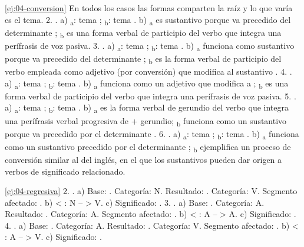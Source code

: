 \begin{solucion}{\ref{ej:04-conversion}}
En todos los casos las formas comparten la raíz y lo que varía es el tema.
2. . a) \textsubscript{a}: tema ;
\textsubscript{b}: tema . b)
\textsubscript{a} es sustantivo porque va precedido del
determinante ; \textsubscript{b} es una forma verbal de
participio del verbo  que integra una perífrasis de voz pasiva.
3. . a) \textsubscript{a}: tema
; \textsubscript{b}: tema . b)
\textsubscript{a} funciona como sustantivo porque va precedido
del determinante ; \textsubscript{b} es la forma verbal
de participio del verbo  empleada como adjetivo (por conversión)
que modifica al sustantivo .
4. . a) \textsubscript{a}: tema
; \textsubscript{b}: tema . b)
\textsubscript{a} funciona como un adjetivo que modifica a
; \textsubscript{b} es una forma verbal de
participio del verbo  que integra una perífrasis de voz pasiva.
5. . a) \textsubscript{a}: tema
; \textsubscript{b}: tema
. b) \textsubscript{a} es la forma verbal
de gerundio del verbo  que integra una perífrasis verbal
progresiva de  + gerundio; \textsubscript{b}
funciona como un sustantivo porque va precedido por el determinante .
6. . a) \textsubscript{a}: tema ;
\textsubscript{b}: tema . b)
\textsubscript{a} funciona como un sustantivo precedido por el
determinante ; \textsubscript{b} ejemplifica un proceso
de conversión similar al del inglés, en el que los sustantivos pueden dar origen
a verbos de significado relacionado.
\end{solucion}

\begin{solucion}{\ref{ej:04-regresiva}}
2. . a) Base: . Categoría: N. Resultado: . Categoría: V. Segmento
afectado: . b)  < : N --
 > V. c) Significado: .
3. . a) Base: . Categoría: A. Resultado:
. Categoría: A. Segmento afectado: . b)
 < : A --  > A. c) Significado:
. 4. . a) Base:
. Categoría: A. Resultado: .
Categoría: V. Segmento afectado: . b)  <
: A --  > V. c) Significado: .
\end{solucion}


